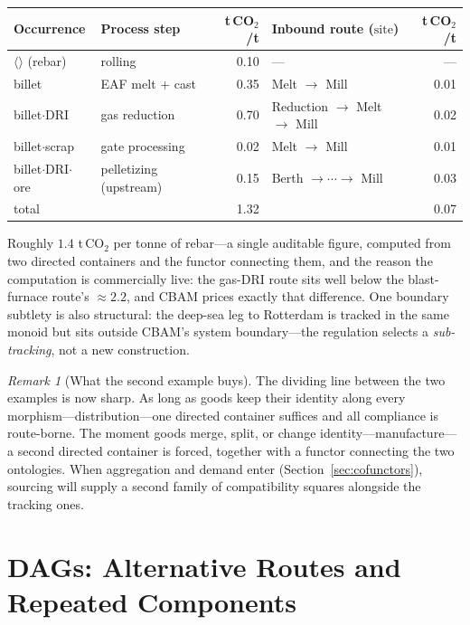 \documentclass[11pt,a4paper]{article}
\newcommand{\site}{\mathrm{site}}
\theoremstyle{plain}
\theoremstyle{definition}
\theoremstyle{remark}
\newtheorem{remark}[theorem]{Remark}
\begin{document}
\begin{center}
\small
\begin{tabular}{llrlr}
\toprule
Occurrence & Process step & t\,CO$_2$/t & Inbound route ($\site$) & t\,CO$_2$/t \\
\midrule
$\langle\rangle$ (rebar) & rolling & 0.10 & --- & --- \\
billet & EAF melt + cast & 0.35 & Melt $\to$ Mill & 0.01 \\
billet$\cdot$DRI & gas reduction & 0.70 & Reduction $\to$ Melt $\to$ Mill & 0.02 \\
billet$\cdot$scrap & gate processing & 0.02 & Melt $\to$ Mill & 0.01 \\
billet$\cdot$DRI$\cdot$ore & pelletizing (upstream) & 0.15 & Berth $\to \cdots \to$ Mill & 0.03 \\
\midrule
total & & 1.32 & & 0.07 \\
\bottomrule
\end{tabular}
\end{center}

Roughly $1.4$ t\,CO$_2$ per tonne of rebar---a single auditable
figure, computed from two directed containers and the functor
connecting them, and the reason the computation is commercially
live: the gas-DRI route sits well below the blast-furnace route's
$\approx 2.2$, and CBAM prices exactly that difference. One boundary
subtlety is also structural: the deep-sea leg to Rotterdam is
tracked in the same monoid but sits outside CBAM's system
boundary---the regulation selects a \emph{sub-tracking}, not a new
construction.

\begin{remark}[What the second example buys]
The dividing line between the two examples is now sharp. As long as
goods keep their identity along every morphism---distribution---one
directed container suffices and all compliance is route-borne. The
moment goods merge, split, or change identity---manufacture---a
second directed container is forced, together with a functor
connecting the two ontologies. When aggregation and demand enter
(Section~\ref{sec:cofunctors}), sourcing will supply a second
family of compatibility squares alongside the tracking ones.
\end{remark}

\section{DAGs: Alternative Routes and Repeated Components}\label{sec:dag}
\end{document}
